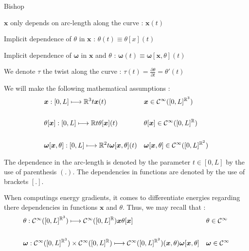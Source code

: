 Bishop

 $\boldsymbol{x}$ only depends on arc-length along the curve : $\boldsymbol{x}(t)$

Implicit dependence of $\theta$ in $\boldsymbol{x}$ : $\theta(t) \equiv \theta[x](t)$

Implicit dependence of $\boldsymbol{\omega}$ in $\boldsymbol{x}$ and $\theta$ : $\boldsymbol{\omega}(t) \equiv \boldsymbol{\omega}[\boldsymbol{x},\theta](t)$

We denote $\tau$ the twist along the curve : $\tau(t) = \frac{\partial \theta}{\partial t} = \theta'(t)$

We will make the following mathematical assumptions :
\begin{align}
	&\boldsymbol{x} : [0,L] \longmapsto \mathbb{R}^3{t}{\boldsymbol{x}(t)}
	&&\boldsymbol{x} \in \mathcal{C}^{\infty}([0,L]^{\mathbb{R}^3})
	\\ \notag\\
	&\theta[\boldsymbol{x}] : [0,L] \longmapsto \mathbb{R}{t}{\theta[\boldsymbol{x}](t)}
	&&\theta[\boldsymbol{x}] \in \mathcal{C}^{\infty}([0,L]^{\mathbb{R}})
	\\ \notag\\
	&\boldsymbol{\omega}[\boldsymbol{x},\theta] : [0,L] \longmapsto \mathbb{R}^2{t}{\boldsymbol{\omega}[\boldsymbol{x},\theta](t)}
	&&\boldsymbol{\omega}[\boldsymbol{x},\theta] \in \mathcal{C}^{\infty}([0,L]^{\mathbb{R}^2})
\end{align}

The dependence in the arc-length is denoted by the parameter $t \in [0,L]$ by the use of parenthesis $(.)$.
The dependencies in functions are denoted by the use of brackets $[.]$.

When computings energy gradients, it comes to differentiate energies regarding there dependencies in functions $\boldsymbol{x}$ and $\theta$. Thus, we may recall that :
\begin{align}
	&\theta : \mathcal{C}^{\infty}([0,L]^{\mathbb{R}^3}) \longmapsto \mathcal{C}^{\infty}([0,L]^\mathbb{R}){\boldsymbol{x}}{\theta[\boldsymbol{x}]}
	&&\theta \in \mathcal{C}^{\infty}
	\\ \notag\\
	&\boldsymbol{\omega} : \mathcal{C}^{\infty}([0,L]^{\mathbb{R}^3}) \times \mathcal{C}^{\infty}([0,L]^{\mathbb{R}}) \longmapsto \mathcal{C}^{\infty}([0,L]^{\mathbb{R}^2}){(\boldsymbol{x},\theta)}{\boldsymbol{\omega}[\boldsymbol{x},\theta]}
	&&\boldsymbol{\omega} \in \mathcal{C}^{\infty}
\end{align}





